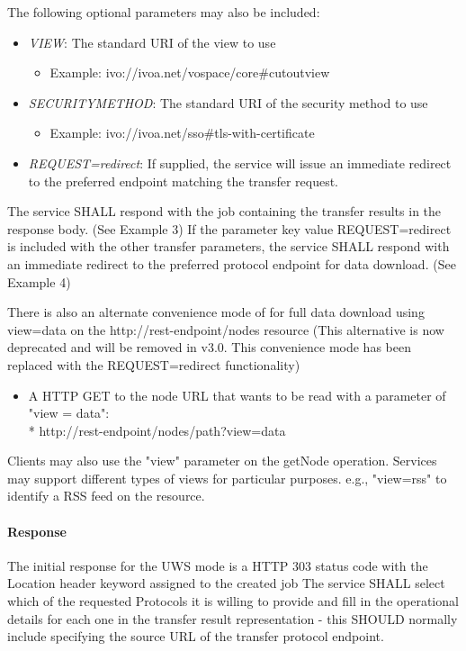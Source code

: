 \documentclass[11pt,a4paper]{ivoa}
\begin{document}
The following optional parameters may also be included:
\begin{itemize}
    \item \emph{VIEW}: The standard URI of the view to use
        \begin{itemize}
           \item Example:  ivo://ivoa.net/vospace/core\#cutoutview
        \end{itemize}
    \item \emph{SECURITYMETHOD}: The standard URI of the security method to use
        \begin{itemize}
           \item Example:  ivo://ivoa.net/sso\#tls-with-certificate
        \end{itemize}
    \item \emph{REQUEST=redirect}: If supplied, the service will issue an immediate redirect to the preferred endpoint matching the transfer request.     
\end{itemize}

The service SHALL respond with the job containing the transfer results in the response body.  (See Example 3)
If the parameter key value REQUEST=redirect is included with the other transfer parameters, the service SHALL respond with an immediate redirect to the preferred protocol endpoint for data download.  (See Example 4)

There is also an alternate convenience mode of for full data download using view=data on the http://rest-endpoint/nodes resource (This alternative is now deprecated and will be removed in v3.0.  This convenience mode has been replaced with the REQUEST=redirect functionality)
\begin{itemize}
    \item A HTTP GET to the node URL that wants to be read with a parameter of "view = data": \\*
        http://rest-endpoint/nodes/path?view=data
\end{itemize}

Clients may also use the "view" parameter on the getNode operation. Services may support different types of views for particular purposes. e.g., "view=rss" to identify a RSS feed on the resource.

\paragraph{Response}
The initial response for the UWS mode is a HTTP 303 status code with the Location header keyword assigned to the created job
The service SHALL select which of the requested Protocols it is willing to provide and fill in the operational details for each one in the transfer result representation - this SHOULD normally include specifying the source URL of the transfer protocol endpoint.
\end{document}
